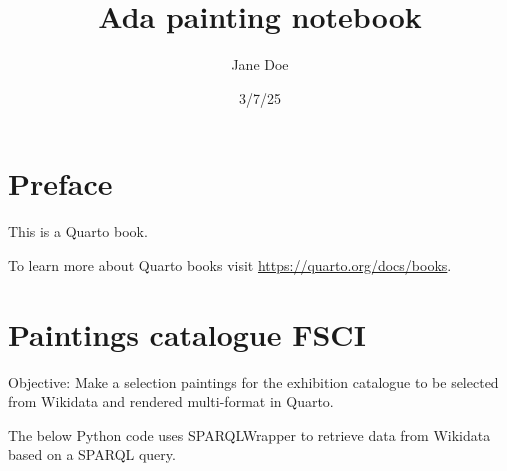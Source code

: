 \documentclass[
  letterpaper,
  DIV=11,
  numbers=noendperiod]{scrreprt}
\title{Ada painting notebook}
\author{Jane Doe}
\date{3/7/25}
\renewcommand*\contentsname{Table of contents}
\newcommand\contentsname{Table of contents}
\begin{document}
\maketitle
\ifdefined\Shaded\renewenvironment{Shaded}{\begin{tcolorbox}[frame hidden, enhanced, boxrule=0pt, sharp corners, interior hidden, borderline west={3pt}{0pt}{shadecolor}, breakable]}{\end{tcolorbox}}\fi

\renewcommand*\contentsname{Table of contents}
{
\hypersetup{linkcolor=}
\setcounter{tocdepth}{2}
\tableofcontents
}

\hypertarget{preface}{%
\chapter*{Preface}\label{preface}}


This is a Quarto book.

To learn more about Quarto books visit
\url{https://quarto.org/docs/books}.


\hypertarget{paintings-catalogue-fsci}{%
\chapter{Paintings catalogue FSCI}\label{paintings-catalogue-fsci}}

Objective: Make a selection paintings for the exhibition catalogue to be
selected from Wikidata and rendered multi-format in Quarto.

The below Python code uses SPARQLWrapper to retrieve data from Wikidata
based on a SPARQL query.
\end{document}
